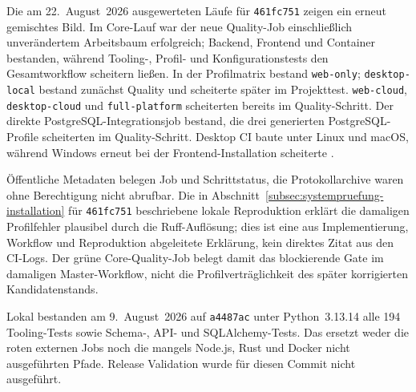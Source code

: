Die am 22.~August~2026 ausgewerteten Läufe für \texttt{461fc751} zeigen ein
erneut gemischtes Bild. Im Core-Lauf war der neue Quality-Job einschließlich
unverändertem Arbeitsbaum erfolgreich; Backend, Frontend und Container
bestanden, während Tooling-, Profil- und Konfigurationstests den
Gesamtworkflow scheitern ließen. In der Profilmatrix bestand
\texttt{web-only}; \texttt{desktop-local} bestand zunächst Quality und
scheiterte später im Projekttest. \texttt{web-cloud},
\texttt{desktop-cloud} und \texttt{full-platform} scheiterten bereits im
Quality-Schritt. Der direkte PostgreSQL-Integrationsjob bestand, die drei
generierten PostgreSQL-Profile scheiterten im Quality-Schritt. Desktop CI
baute unter Linux und macOS, während Windows erneut bei der
Frontend-Installation scheiterte
\parencite{kleiveist2026governance-core-run,kleiveist2026governance-profiles-run,kleiveist2026governance-postgres-run,kleiveist2026governance-desktop-run}.

Öffentliche Metadaten belegen Job und Schrittstatus, die Protokollarchive waren
ohne Berechtigung nicht abrufbar. Die in
Abschnitt~\ref{subsec:systempruefung-installation} für \texttt{461fc751}
beschriebene lokale Reproduktion erklärt die damaligen Profilfehler plausibel
durch die Ruff-Auflösung; dies ist eine aus Implementierung, Workflow und
Reproduktion abgeleitete Erklärung, kein direktes Zitat aus den CI-Logs. Der
grüne Core-Quality-Job belegt damit das blockierende Gate im damaligen
Master-Workflow, nicht die Profilverträglichkeit des später korrigierten
Kandidatenstands.

Lokal bestanden am 9.~August~2026 auf \texttt{a4487ac} unter Python~3.13.14 alle
194 Tooling-Tests sowie Schema-, API- und SQLAlchemy-Tests. Das ersetzt weder
die roten externen Jobs noch die mangels Node.js, Rust und Docker nicht
ausgeführten Pfade. Release Validation wurde für diesen Commit nicht
ausgeführt.
